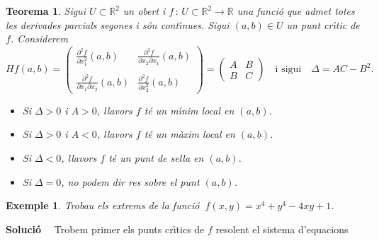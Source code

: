 \documentclass[12pt]{article}
\newcommand{\solucio}{\textbf{Soluci{\'o}}\ \ }
\newtheorem{teorema}{Teorema}[subsection]
\newtheorem{exemple}{Exemple}[subsection]
\newcommand{\R}{\mathbb{R}}
\begin{document}
\vspace{0.4cm}
\begin{teorema}
Sigui $ U \subset \R ^ 2 $ un obert i $ f \,: \, U \subset
\R ^ 2 \longrightarrow \R $ una funci{\'o} que admet totes les derivades parcials segones i s{\'o}n cont{\'\i}nues. Sigui
$ (a, b) \in U $ un punt cr{\'\i}tic de $ f $. Considerem
\[
Hf (a, b) =
  \left (\begin{matrix}
    \displaystyle\frac{\partial ^ 2 f}{\partial x_1 ^ 2} (a, b) & \displaystyle\frac{\partial ^ 2 f}{\partial x_2 \partial
x_1} (a, b) \\
\\
\displaystyle\frac{\partial ^ 2 f}{\partial x_1\partial x_2}    (a, b) &  \displaystyle\frac{\partial ^ 2 f}{\partial x_2 ^ 2}(a, b)
  \end{matrix} \right)
= \left (\begin{matrix}
    A & B \\    B & C
  \end{matrix} \right)
\quad \mbox{i sigui} \quad \Delta = AC-B ^ 2.
\]
\begin{itemize}
\item [a)] Si $ \Delta> 0 $ i $ A> 0 $, llavors $ f $ t{\'e}  un
m{\'\i}nim local en $ (a, b) $.
\item [b)] Si $ \Delta> 0 $ i $ A <0 $, llavors $ f $ t{\'e} un
m{\`a}xim local en $ (a, b) $.
\item [c)] Si $ \Delta <0 $, llavors $ f $ t{\'e} un
punt de sella en $ (a, b) $.
\item [d)] Si $ \Delta = 0 $,  no podem dir res sobre el punt $ (a, b) $.
\end{itemize}
\end{teorema}


\vspace{0.4cm}
\begin{exemple}
Trobau els extrems de la funci{\'o} $\ f (x, y) = x^4 + y^4-4xy +1 $.
\end{exemple}

\solucio
Trobem  primer els punts cr{\'\i}tics de $ f $
resolent el sistema d'equacions
\end{document}
